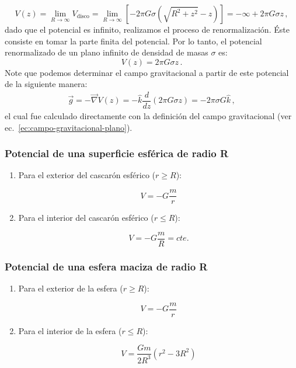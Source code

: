 \begin{equation}
V(z)=\lim_{R\to\infty} V_{\text{disco}} 
=\lim_{R\to\infty} \left[-2\pi G \sigma \left(\sqrt{R^2+z^2} -z\right)\right] = -\infty +2\pi G \sigma z\,,
\end{equation}
dado que el potencial es infinito, realizamos el proceso de renormalización. Éste consiste en tomar la parte finita del potencial. Por lo tanto, el potencial renormalizado de un plano infinito de densidad de masas $\sigma$ es:
\begin{equation}
V(z)=2\pi G \sigma z\,.
\label{ec:potencial-gravitacional-plano}
\end{equation} 
Note que podemos determinar el campo gravitacional a partir de este potencial de la siguiente manera:
\begin{eqnarray}
\vec{g}=-\vec{\nabla}V(z)=-\hat{k}\dfrac{d}{dz}(2\pi G \sigma z)=-2\pi\sigma G \hat{k}\,,
\end{eqnarray}
el cual fue calculado directamente con la definición del campo gravitacional (ver ec.~\ref{ec:campo-gravitacional-plano}).



\subsubsection{Potencial de una superficie esférica de radio R} 

\begin{enumerate}
\item Para el exterior del cascarón esférico ($r \geq R$):

\begin{equation}
V=-G \dfrac{m}{r}  
\end{equation}

\item Para el interior del cascarón esférico ($r \leq R$):

\begin{equation}
V=-G \dfrac{m}{R}=cte.
\end{equation}

\end{enumerate}

\subsubsection{Potencial de una esfera maciza de radio R}

\begin{enumerate}
\item Para el exterior de la esfera ($r \geq R$):

\begin{equation}
V=-G \dfrac{m}{r}  
\end{equation}

\item Para el interior de la esfera ($r \leq R$):

\begin{equation}
V=\dfrac{Gm}{2R^3}(r^2-3R^2)
\end{equation}

\end{enumerate}
